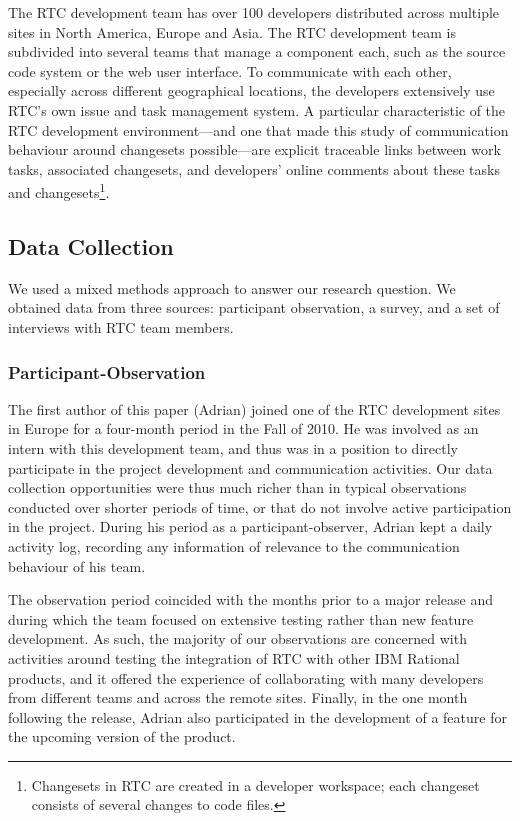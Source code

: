 \documentclass{sig-alternate}
\begin{document}
The RTC development team has over 100 developers distributed across multiple sites in North America, Europe and Asia.  The RTC development team is subdivided into several teams that manage a component each, such as the source code system or the web user interface. To communicate with each other, especially across different geographical locations, the developers extensively use RTC's own issue and task management system. A particular characteristic of the RTC development environment---and one that made this study of communication behaviour around changesets possible---are explicit traceable links between work tasks, associated changesets, and developers' online comments about these tasks and changesets\footnote{Changesets in RTC are created in a developer workspace; each changeset consists of several changes to code files.}.

\vspace{4mm}
\subsection{Data Collection}

We used a mixed methods approach to answer our research question. We obtained data from three sources: participant observation, a survey, and a set of interviews with RTC team members.

\subsubsection{Participant-Observation}

The first author of this paper (Adrian) joined one of the RTC development sites in Europe for a four-month period in the Fall of 2010. He was involved as an intern with this development team, and thus was in a position to directly participate in the project development and communication activities. Our data collection opportunities were thus much richer than in typical observations conducted over shorter periods of time, or that do not involve active participation in the project.  During his period as a participant-observer, Adrian kept a daily activity log, recording any information of relevance to the communication behaviour of his team.

The observation period coincided with the months prior to a major release and during which the team focused on extensive testing rather than new feature development. As such, the majority of our observations are concerned with activities around testing the integration of RTC with other IBM Rational products, and it offered the experience of collaborating with many developers from different teams and across the remote sites. Finally, in the one month following the release, Adrian also participated in the development of a feature for the upcoming version of the product.
\end{document}
